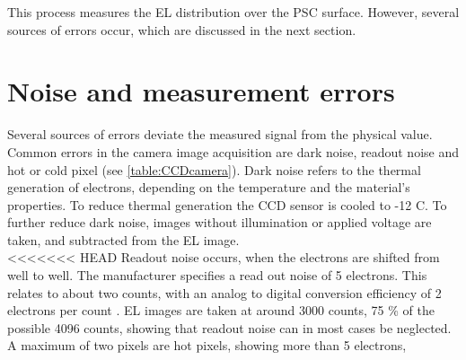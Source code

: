 This process measures the EL distribution over the PSC surface. However, several sources of errors occur, which are discussed in the next section.
\FloatBarrier
\section{Noise and measurement errors}
Several sources of errors deviate the measured signal from the physical value. Common errors in the camera image acquisition are dark noise, readout noise and hot or cold pixel (see \autoref{table:CCDcamera}). Dark noise refers to the thermal generation of electrons, depending on the temperature and the material's properties. To reduce thermal generation the CCD sensor is cooled to -12 \textdegree C. To further reduce dark noise, images without illumination or applied voltage are taken, and subtracted from the EL image.\\

<<<<<<< HEAD
Readout noise occurs, when the electrons are shifted from well to well. The manufacturer specifies a read out noise of 5 electrons. This relates to about two counts, with an analog to digital conversion efficiency of 2 electrons per count \cite{ManualSensicam}. EL images are taken at around 3000 counts, 75 \% of the possible 4096 counts, showing that readout noise can in most cases be neglected. A maximum of two pixels are hot pixels, showing more than 5 electrons,  \\

